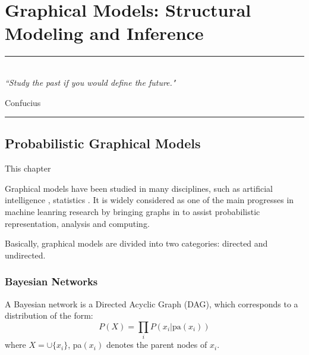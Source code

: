 
\chapter{Graphical Models: Structural Modeling and Inference} %

\label{Chapter2} %


\rule{\textwidth}{0.4pt} \\[0.5cm]
\textit{``Study the past if you would define the future."}

\begin{flushright}
Confucius
\end{flushright}
\rule{\textwidth}{0.4pt} 




\section{Probabilistic Graphical Models}

This chapter     

Graphical models have been studied in many disciplines, such as artificial intelligence \citep{pear_1988}, statistics \citep{lauritzan_1988}.  It is widely considered 
as one of the main progresses in machine leanring research by bringing graphs in to assist probabilistic representation, analysis and computing. 


Basically, graphical models are divided into two categories: directed and undirected.  

\subsection{Bayesian Networks}
\begin{definition}
 A Bayesian network is a Directed Acyclic Graph (DAG), which corresponds to a distribution of the form:
 \begin{equation}
  P(X)=\prod_i P(x_i|\text{pa}(x_i))
 \end{equation}
where $X=\cup\{x_i\}$, pa$(x_i)$ denotes the parent nodes of $x_i$. 
\end{definition}

